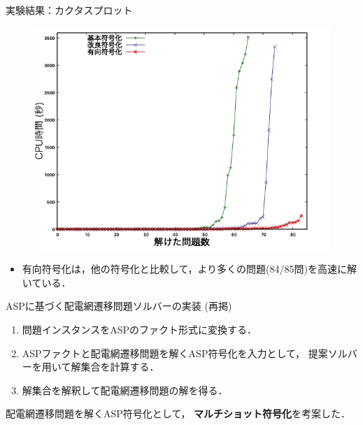 \documentclass[dvipdfmx,11pt]{beamer}
\begin{document}
\begin{frame}{実験結果：カクタスプロット}
 \begin{figure}[h]
  \centering
  \includegraphics[scale=0.4]{fig/cactus.png}
 \end{figure}

\begin{itemize}
 \item 有向符号化は，他の符号化と比較して，より多くの問題(84/85問)を高速に解いている．
\end{itemize}\vfill
\end{frame}
\begin{frame}{ASPに基づく配電網遷移問題ソルバーの実装 (再掲)}
 \centering
 \scalebox{0.6}{\hspace{-1zw}}
 \vfill
 \begin{enumerate}
  \item 問題インスタンスをASPのファクト形式に変換する．
  \item ASPファクトと配電網遷移問題を解くASP符号化を入力として，
        提案ソルバーを用いて解集合を計算する．
  \item 解集合を解釈して配電網遷移問題の解を得る．
 \end{enumerate}\vfill
 \begin{alertblock}{}
  配電網遷移問題を解くASP符号化として，
  \alert{\bf マルチショット符号化}を考案した．
 \end{alertblock}
\end{frame}
\end{document}
